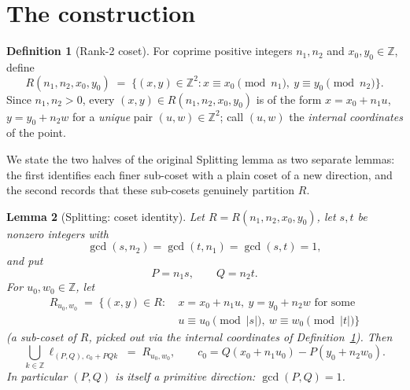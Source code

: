 \documentclass[a4paper,11pt,oneside,reqno]{amsart}
\theoremstyle{definition}
\newtheorem{definition}{Definition}
\theoremstyle{remark}
\theoremstyle{plain}
\newtheorem{lemma}[definition]{Lemma}
\newcommand{\Z}{\mathbb{Z}}
\begin{document}
\section{The construction}
\label{sec:construction}

\begin{definition}[Rank-2 coset]
  \label{def:Rcoset}
  For coprime positive integers \(n_1,n_2\) and \(x_0,y_0\in\Z\), define
  \begin{equation}
    \label{eq:Rcoset-def}
    R(n_1,n_2,x_0,y_0) \;=\; \{(x,y)\in\Z^2 : x\equiv x_0\!\!\pmod{n_1},\ y\equiv y_0\!\!\pmod{n_2}\}.
  \end{equation}
  Since \(n_1,n_2>0\), every \((x,y)\in R(n_1,n_2,x_0,y_0)\) is of the form \(x=x_0+n_1u\), \(y=y_0+n_2w\)
  for a \emph{unique} pair \((u,w)\in\Z^2\); call \((u,w)\) the \emph{internal coordinates} of the
  point.
\end{definition}

We state the two halves of the original Splitting lemma as two separate lemmas: the first
identifies each finer sub-coset with a plain coset of a new direction, and the second records that
these sub-cosets genuinely partition \(R\).

\begin{lemma}[Splitting: coset identity]
  \label{lem:splitting-coset}
  Let \(R=R(n_1,n_2,x_0,y_0)\), let \(s,t\) be nonzero integers with
  \begin{equation}
    \label{eq:splitting-hyps}
    \gcd(s,n_2)=\gcd(t,n_1)=\gcd(s,t)=1,
  \end{equation}
  and put
  \begin{equation}
    \label{eq:PQ-def}
    P=n_1s, \qquad Q=n_2t.
  \end{equation}
  For \(u_0,w_0\in\Z\), let
  \begin{equation}
    \label{eq:Rsub-def}
    \begin{aligned}
      R_{u_0,w_0} \;=\; \{(x,y)\in R :\ & x=x_0+n_1u,\ y=y_0+n_2w \text{ for some } \\
      & u\equiv u_0\!\!\pmod{|s|},\ w\equiv w_0\!\!\pmod{|t|}\}
    \end{aligned}
  \end{equation}
  (a sub-coset of \(R\), picked out via the internal coordinates of Definition~\ref{def:Rcoset}).
  Then
  \begin{equation}
    \label{eq:splitting-coset-conclusion}
    \bigcup_{k\in\Z} \ell_{(P,Q),\,c_0+PQk} \;=\; R_{u_0,w_0}, \qquad c_0 =
    Q(x_0+n_1u_0)-P(y_0+n_2w_0).
  \end{equation}
  In particular \((P,Q)\) is itself a primitive direction: \(\gcd(P,Q)=1\).
\end{lemma}
\end{document}
